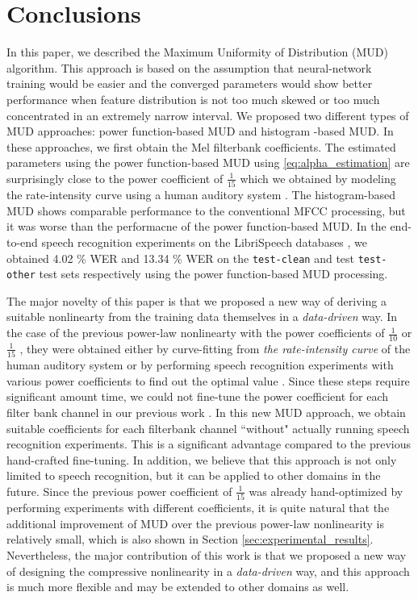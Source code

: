 \documentclass[a4paper]{article}
\begin{document}
\section{Conclusions}
\label{sec:conclusion}
In this paper, we described the Maximum Uniformity of Distribution 
(MUD) algorithm. This approach is based on the assumption that
neural-network training would be easier and the converged parameters would show better
performance when feature distribution is not too much 
skewed or too much concentrated in an extremely narrow interval. We proposed
two different types of MUD approaches: power function-based MUD and histogram
-based MUD. In these approaches, we first obtain the Mel filterbank
coefficients. The estimated parameters using the power function-based MUD 
using \eqref{eq:alpha_estimation} are surprisingly close to the power 
coefficient of $\frac{1}{15}$ which we obtained by modeling the rate-intensity 
curve using a human auditory system \cite{C_Kim_PhDThesis_2010,
C_Kim_IEEETran_2016_1}. The histogram-based MUD shows comparable performance
to the conventional MFCC processing, but it was worse than the performacne
of the power function-based MUD. In the end-to-end speech recognition
experiments on the LibriSpeech databases \cite{v_panayotov_icassp_2015_00},
we obtained 4.02 \%  WER and 13.34 \% WER on the  {\tt test-clean} and 
test {\tt test-other} test sets respectively using the power function-based
MUD processing. 

The major novelty of this paper is that we proposed a new way of deriving 
a suitable nonlinearty from the training data themselves in a 
{\it data-driven} way. 
In the case of the previous power-law nonlinearty with the power coefficients of 
$\frac{1}{10}$ \cite{C_Kim_INTERSPEECH_2009_2} or $\frac{1}{15}$ \cite{C_Kim_ICASSP_2012_1}, 
they were obtained either by curve-fitting from {\it the rate-intensity curve } of the 
human auditory system \cite{C_Kim_IEEETran_2016_1}
or by performing speech recognition experiments with various power coefficients 
to find out the optimal value \cite{C_Kim_PhDThesis_2010}. 
Since these steps require significant amount time, 
we could not fine-tune the power coefficient for 
each filter bank channel in our previous work \cite{C_Kim_IEEETran_2016_1}. 
In this new MUD approach, we obtain suitable coefficients for 
each filterbank channel ``without" actually running speech recognition experiments. 
This is a significant advantage compared to the previous hand-crafted fine-tuning. 
In addition, we believe that this approach is not only limited to speech
recognition, but it can be applied to other domains in the future. 
Since the  previous power coefficient of $\frac{1}{15}$ was already hand-optimized 
by performing experiments with different coefficients, it is quite natural 
that the additional improvement of MUD over the previous power-law nonlinearity
is relatively small, which is also shown in Section 
\ref{sec:experimental_results}.
Nevertheless, the major contribution of this work is that we proposed 
a new way of designing the compressive nonlinearity in a {\it data-driven } way,
and this approach is much more flexible and may be extended to other domains 
as well.
%
%
%
%
\ninept


\end{document}
